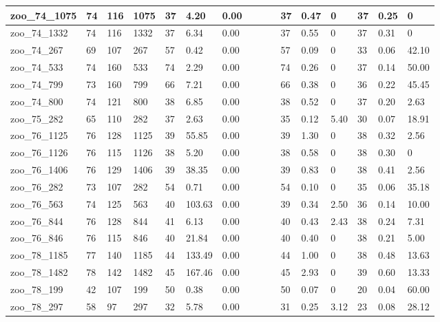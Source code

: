 \begin{landscape}
\begin{longtable}{llllllllllllllll}
zoo\_74\_1075 & 74 & 116 & 1075 & 37 & 4.20 & 0.00 &  &  &  & 37 & 0.47 & 0 & 37 & 0.25 & 0 \\ \hline 
zoo\_74\_1332 & 74 & 116 & 1332 & 37 & 6.34 & 0.00 &  &  &  & 37 & 0.55 & 0 & 37 & 0.31 & 0 \\ \hline 
zoo\_74\_267 & 69 & 107 & 267 & 57 & 0.42 & 0.00 &  &  &  & 57 & 0.09 & 0 & 33 & 0.06 & 42.10 \\ \hline 
zoo\_74\_533 & 74 & 160 & 533 & 74 & 2.29 & 0.00 &  &  &  & 74 & 0.26 & 0 & 37 & 0.14 & 50.00 \\ \hline 
zoo\_74\_799 & 73 & 160 & 799 & 66 & 7.21 & 0.00 &  &  &  & 66 & 0.38 & 0 & 36 & 0.22 & 45.45 \\ \hline 
zoo\_74\_800 & 74 & 121 & 800 & 38 & 6.85 & 0.00 &  &  &  & 38 & 0.52 & 0 & 37 & 0.20 & 2.63 \\ \hline 
zoo\_75\_282 & 65 & 110 & 282 & 37 & 2.63 & 0.00 &  &  &  & 35 & 0.12 & 5.40 & 30 & 0.07 & 18.91 \\ \hline 
zoo\_76\_1125 & 76 & 128 & 1125 & 39 & 55.85 & 0.00 &  &  &  & 39 & 1.30 & 0 & 38 & 0.32 & 2.56 \\ \hline 
zoo\_76\_1126 & 76 & 115 & 1126 & 38 & 5.20 & 0.00 &  &  &  & 38 & 0.58 & 0 & 38 & 0.30 & 0 \\ \hline 
zoo\_76\_1406 & 76 & 129 & 1406 & 39 & 38.35 & 0.00 &  &  &  & 39 & 0.83 & 0 & 38 & 0.41 & 2.56 \\ \hline 
zoo\_76\_282 & 73 & 107 & 282 & 54 & 0.71 & 0.00 &  &  &  & 54 & 0.10 & 0 & 35 & 0.06 & 35.18 \\ \hline 
zoo\_76\_563 & 74 & 125 & 563 & 40 & 103.63 & 0.00 &  &  &  & 39 & 0.34 & 2.50 & 36 & 0.14 & 10.00 \\ \hline 
zoo\_76\_844 & 76 & 128 & 844 & 41 & 6.13 & 0.00 &  &  &  & 40 & 0.43 & 2.43 & 38 & 0.24 & 7.31 \\ \hline 
zoo\_76\_846 & 76 & 115 & 846 & 40 & 21.84 & 0.00 &  &  &  & 40 & 0.40 & 0 & 38 & 0.21 & 5.00 \\ \hline 
zoo\_78\_1185 & 77 & 140 & 1185 & 44 & 133.49 & 0.00 &  &  &  & 44 & 1.00 & 0 & 38 & 0.48 & 13.63 \\ \hline 
zoo\_78\_1482 & 78 & 142 & 1482 & 45 & 167.46 & 0.00 &  &  &  & 45 & 2.93 & 0 & 39 & 0.60 & 13.33 \\ \hline 
zoo\_78\_199 & 42 & 107 & 199 & 50 & 0.38 & 0.00 &  &  &  & 50 & 0.07 & 0 & 20 & 0.04 & 60.00 \\ \hline 
zoo\_78\_297 & 58 & 97 & 297 & 32 & 5.78 & 0.00 &  &  &  & 31 & 0.25 & 3.12 & 23 & 0.08 & 28.12 \\ \hline 

\end{longtable}
\end{landscape}
